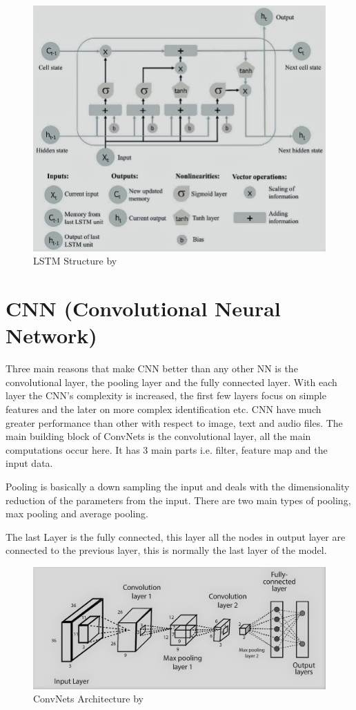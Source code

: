 \documentclass[oneside,12pt]{Classes/RoboticsLaTeX}
\begin{document}
\begin{figure}[H]
  \centering
  \includegraphics[width=0.90\linewidth]{Figures/lstm.png}
  \caption{LSTM Structure by \cite{yan}}
  \label{fig:lstm}
\end{figure}

\section{CNN (Convolutional Neural Network)}

Three main reasons that make CNN better than any other NN is  the convolutional layer, the pooling layer and the fully connected layer. With each layer the CNN's complexity is increased, the first few layers focus on simple features and the later on more complex identification etc. CNN have much greater performance than other with respect to image, text and audio files. The main building block of ConvNets is the convolutional layer, all the main computations occur here. It  has 3 main parts i.e. filter, feature map and the input data. \cite{ibm}

Pooling is basically a down sampling the input and deals with the dimensionality reduction of the parameters from the input. \cite{ibm} There are two main types of pooling, max pooling and average pooling.

The last Layer is the fully connected, this layer all the nodes in output layer are connected to the previous layer, this is normally the last layer of the model.

\begin{figure}[H]
  \centering
  \includegraphics[width=0.90\linewidth]{Figures/cnn.png}
  \caption{ConvNets Architecture by \cite{cnnfig}}
  \label{fig:cnn}
\end{figure}
\end{document}

